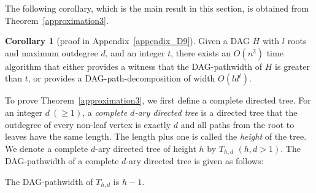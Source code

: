 \documentclass[runningheads]{llncs}
\theoremstyle{plain}
\newtheorem{cor}{Corollary}
\theoremstyle{definition}
\newtheorem{cor}{Corollary}
\begin{document}
The following corollary, which is the main result in this section, is obtained from Theorem~\ref{approximation3}.

\begin{cor}[proof in Appendix~\ref{appendix_D9}]\label{cor}
    Given a DAG $H$ with $l$ roots and maximum outdegree $d$, and an integer $t$, there exists an $O(n^2)$ time algorithm that either provides a witness that the DAG-pathwidth of $H$ is greater than $t$, or provides a DAG-path-decomposition of width $O(ld^t)$.
\end{cor}


To prove Theorem~\ref{approximation3}, we first define a complete directed tree. For an integer $d~(\geq 1)$, a \emph{complete $d$-ary directed tree} is a directed tree that the outdegree of every non-leaf vertex is exactly $d$ and all paths from the root to leaves have the same length. The length plus one is called the \emph{height} of the tree. %
We denote a complete $d$-ary directed tree of height $h$ by $T_{h, d}$ $(h, d > 1)$. The DAG-pathwidth of a complete $d$-ary directed tree is given as follows: 

\begin{lemma}\label{comp_tree}
    The DAG-pathwidth of $T_{h, d}$ is $h-1$.
\end{lemma}

\end{document}
